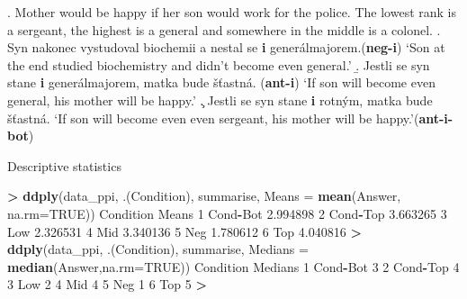 \documentclass[ignorenonframetext,]{beamer}
\newenvironment{Shaded}{\begin{snugshade}}{\end{snugshade}}
\newcommand{\KeywordTok}[1]{\textcolor[rgb]{0.13,0.29,0.53}{\textbf{#1}}}
\newcommand{\DataTypeTok}[1]{\textcolor[rgb]{0.13,0.29,0.53}{#1}}
\newcommand{\DecValTok}[1]{\textcolor[rgb]{0.00,0.00,0.81}{#1}}
\newcommand{\FloatTok}[1]{\textcolor[rgb]{0.00,0.00,0.81}{#1}}
\newcommand{\StringTok}[1]{\textcolor[rgb]{0.31,0.60,0.02}{#1}}
\newcommand{\OtherTok}[1]{\textcolor[rgb]{0.56,0.35,0.01}{#1}}
\newcommand{\OperatorTok}[1]{\textcolor[rgb]{0.81,0.36,0.00}{\textbf{#1}}}
\newcommand{\NormalTok}[1]{#1}
\newcommand{\cond}[1]{\textbf{#1}}
\begin{document}
\begin{frame}

\ex. Mother would be happy if her son would work for the police. The
lowest rank is a sergeant, the highest is a general and somewhere in the
middle is a colonel.\label{ex-2} \a. Syn nakonec vystudoval biochemii a
nestal se \textbf{i}
generálmajorem.\hfill (\cond{neg-i})\label{ex-2-d}\newline
`Son at the end studied biochemistry and didn't become even general.'
\b. Jestli se syn stane \textbf{i} generálmajorem, matka bude šťastná.
\hfill (\cond{ant-i})\label{ex-2-e}\newline
`If son will become even general, his mother will be happy.' \c. Jestli
se syn stane \textbf{i} rotným, matka bude šťastná. \newline
`If son will become even even sergeant, his mother will be
happy.'\hfill (\cond{ant-i-bot})

\end{frame}

\begin{frame}[fragile]{Descriptive statistics}

\tiny 

\begin{Shaded}
\begin{Highlighting}[]
\OperatorTok{>}\StringTok{ }\KeywordTok{ddply}\NormalTok{(data_ppi, .(Condition), summarise, }\DataTypeTok{Means =} \KeywordTok{mean}\NormalTok{(Answer, }\DataTypeTok{na.rm=}\OtherTok{TRUE}\NormalTok{))}
\NormalTok{  Condition    Means}
\DecValTok{1}\NormalTok{  Cond}\OperatorTok{-}\NormalTok{Bot }\FloatTok{2.994898}
\DecValTok{2}\NormalTok{  Cond}\OperatorTok{-}\NormalTok{Top }\FloatTok{3.663265}
\DecValTok{3}\NormalTok{       Low }\FloatTok{2.326531}
\DecValTok{4}\NormalTok{       Mid }\FloatTok{3.340136}
\DecValTok{5}\NormalTok{       Neg }\FloatTok{1.780612}
\DecValTok{6}\NormalTok{       Top }\FloatTok{4.040816}
\OperatorTok{>}\StringTok{ }\KeywordTok{ddply}\NormalTok{(data_ppi, .(Condition), summarise, }\DataTypeTok{Medians =} \KeywordTok{median}\NormalTok{(Answer,}\DataTypeTok{na.rm=}\OtherTok{TRUE}\NormalTok{))}
\NormalTok{  Condition Medians}
\DecValTok{1}\NormalTok{  Cond}\OperatorTok{-}\NormalTok{Bot       }\DecValTok{3}
\DecValTok{2}\NormalTok{  Cond}\OperatorTok{-}\NormalTok{Top       }\DecValTok{4}
\DecValTok{3}\NormalTok{       Low       }\DecValTok{2}
\DecValTok{4}\NormalTok{       Mid       }\DecValTok{4}
\DecValTok{5}\NormalTok{       Neg       }\DecValTok{1}
\DecValTok{6}\NormalTok{       Top       }\DecValTok{5}
\OperatorTok{>}\StringTok{ }
\end{Highlighting}
\end{Shaded}

\end{frame}
\end{document}
